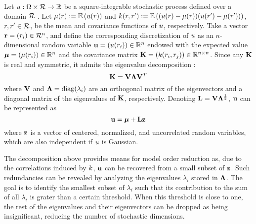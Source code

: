 Let $u: \Omega \times \mathcal{R} \to \mathbb{R}$ be a square-integrable stochastic process defined over a domain $\mathcal{R}$ \cite{durrett2010}. Let $\fMean{\r} := \E{\u(\r)}$ and $\fCov{\r, \r'} := \E{(\u(\r) - \fMean{\r}) (\u(\r') - \fMean{\r'})}$, $r, r' \in \mathcal{R}$, be the mean and covariance functions of $u$, respectively. Take a vector $\mathbf{r} = (r_i) \in \mathcal{R}^n$, and define the corresponding discretization of $u$ as an $n$-dimensional random variable $\mathbf{u} = (u(r_i)) \in \mathbb{R}^n$ endowed with the expected value $\vmean = (\fMean{\r_i}) \in \real^n$ and the covariance matrix $\mCov = (\fCov{\r_i, \r_j}) \in \real^{n \times n}$. Since any $\mathbf{K}$ is real and symmetric, it admits the eigenvalue decomposition \cite{press2007}:
\[
  \mathbf{K} = \mathbf{V} \mathbf{\Lambda} \mathbf{V}^T
\]
where $\mathbf{V}$ and $\mathbf{\Lambda} = \text{diag}(\lambda_i)$ are an orthogonal matrix of the eigenvectors and a diagonal matrix of the eigenvalues of $\mathbf{K}$, respectively. Denoting $\mathbf{L} = \mathbf{V} \mathbf{\Lambda}^\frac{1}{2}$, $\mathbf{u}$ can be represented as
\[
  \mathbf{u} = {\boldsymbol\mu} + \mathbf{L} \mathbf{z}
\]
where $\mathbf{z}$ is a vector of centered, normalized, and uncorrelated random variables, which are also independent if $u$ is Gaussian.

The decomposition above provides means for model order reduction as, due to the correlations induced by $\fCov$, $\mathbf{u}$ can be recovered from a small subset of $\mathbf{z}$. Such redundancies can be revealed by analyzing the eigenvalues $\lambda_i$ stored in $\mathbf{\Lambda}$.
The goal is to identify the smallest subset of $\lambda_i$ such that its contribution to the sum of all $\lambda_i$ is grater than a certain threshold.
When this threshold is close to one, the rest of the eigenvalues and their eigenvectors can be dropped as being insignificant, reducing the number of stochastic dimensions.

